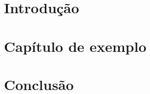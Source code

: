 \documentclass[
	12pt,				%
    oneside,			%
	a4paper,			%
	english,			%
	french,				%
	spanish,			%
	brazil,				%
	]{abntex2-modificado}
\begin{document}
\tableofcontents*
\cleardoublepage

\textual

\chapter{Introdução}
\label{chap:introducao}


\chapter{Capítulo de exemplo}
\label{chap:capitulo-exemplo}

\label{chap:capitulo-exemplo2}


\chapter{Conclusão}
\label{chap:conclusao}



\postextual


\end{document}
